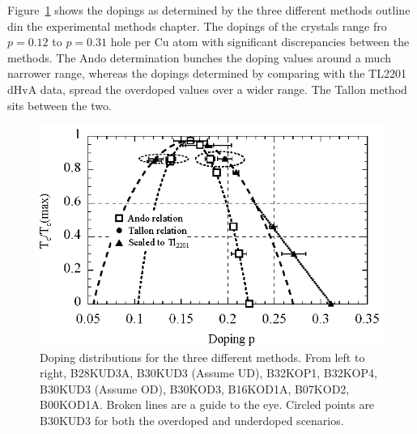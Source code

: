 Figure~\ref{Fig:ResH:Dopings} shows the dopings as determined by the three different methods outline din the experimental methods chapter. The dopings of the crystals range fro $p=0.12$ to $p=0.31$ hole per Cu atom with significant discrepancies between the methods. The Ando determination bunches the doping values around a much narrower range, whereas the dopings determined by comparing with the \ac{TL2201} \ac{dHvA} data, spread the overdoped values over a wider range. The Tallon method sits between the two.

\begin{figure}[htbp]
    \begin{center}
        \includegraphics[scale=1.1]{Chapter-HallBSCO/Figures/Dopings/Dopings}
        \caption{Doping distributions for the three different methods. From left to right, B28KUD3A, B30KUD3 (Assume UD), B32KOP1, B32KOP4, B30KUD3 (Assume OD), B30KOD3, B16KOD1A, B07KOD2, B00KOD1A. Broken lines are a guide to the eye. Circled points are B30KUD3 for both the overdoped and underdoped scenarios.}
        \label{Fig:ResH:Dopings}
    \end{center}
\end{figure}

